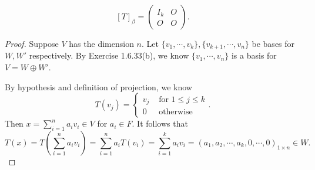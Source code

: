 \begin{Exercise}
\begin{answer}
$$
[T]_{\beta} = \begin{pmatrix}
I_k & O \\
O & O 
\end{pmatrix}.
$$
\end{answer}
\begin{proof}
Suppose $V$ has the dimension $n$. Let $\{v_1,\cdots,v_k\}, \{v_{k+1},\cdots,v_n\}$ be bases for $W,W'$ respectively. By Exercise 1.6.33(b), we know $\{v_1,\cdots,v_n\}$ is a basis for $V=W\oplus W'$.

By hypothesis and definition of projection, we know
$$
T(v_j) = \begin{cases}
v_j & \mbox{ for } 1\leq j \leq k \\
0 & \mbox{ otherwise}
\end{cases}.
$$
Then $x = \sum_{i=1}^{n} a_i v_i \in V$ for $a_i\in F$. It follows that
$$
T(x) = T\left(\sum_{i=1}^{n}a_i v_i\right) 
= \sum_{i=1}^{n}a_i T(v_i)
= \sum_{i=1}^{k}a_i v_i
= (a_1, a_2, \cdots, a_k, 0, \cdots, 0)_{1\times n} \in W.
$$
\end{proof}
\end{Exercise}